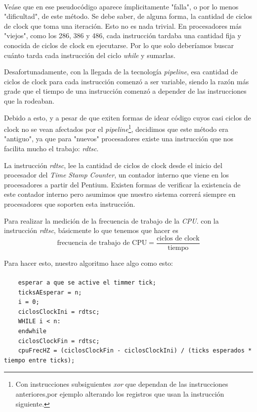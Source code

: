 \documentclass[a4paper,10pt]{article}
\begin{document}
    \paragraph*{}
    Veáse que en ese pseudocódigo aparece ímplicitamente "falla", o por lo menos "dificultad", de este método. Se debe saber, de alguna forma, la cantidad de ciclos
    de clock que toma una iteración. Esto no es nada trivial. En procesadores más "viejos", como los 286, 386 y 486, cada instrucción tardaba una cantidad fija y conocida
    de ciclos de clock en ejecutarse. Por lo que solo deberíamos buscar cuánto tarda cada instrucción del ciclo \textit{while} y sumarlas.

    Desafortunadamente, con la llegada de la tecnología \textit{pipeline}, esa cantidad de ciclos de clock para cada instrucción comenzó a ser variable, siendo la 
    razón más grade que el tiempo de una instrucción comenzó a depender de las instrucciones que la rodeaban.

    Debido a esto, y a pesar de que exiten formas de idear código cuyos casi ciclos de clock no se vean afectados por el \textit{pipeline}\footnote{ Con 
    instrucciones subsiguientes \textit{xor} que dependan de las instrucciones anteriores,por ejemplo alterando los registros que usan la instrucción siguiente.}, 
    decidimos que este método era "antiguo", ya que para "nuevos" procesadores existe una instrucción que nos facilita mucho el trabajo: \textit{rdtsc}.

    La instrucción \textit{rdtsc}, lee la cantidad de ciclos de clock desde el inicio del procesador del \textit{Time Stamp Counter}, un contador interno que viene
    en los procesadores a partir del Pentium. Existen formas de verificar la existencia de este contador interno pero asumimos que nuestro sistema correrá siempre en
    procesadores que soporten esta instrucción.

    Para realizar la medición de la frecuencia de trabajo de la \textit{CPU}. con la instrucción \textit{rdtsc}, básicmente lo que tenemos que hacer es 
    \[  \text{frecuencia de trabajo de CPU} = \dfrac{\text{ciclos de clock}}{\text{tiempo}} \]
    
    Para hacer esto, nuestro algoritmo hace algo como esto:
    \paragraph*{}
    \begin{lstlisting}
    esperar a que se active el timmer tick;
    ticksAEsperar = n;
    i = 0;
    ciclosClockIni = rdtsc;
    WHILE i < n:
    endwhile
    ciclosClockFin = rdtsc;
    cpuFrecHZ = (ciclosClockFin - ciclosClockIni) / (ticks esperados * tiempo entre ticks);
    \end{lstlisting}
\end{document}
